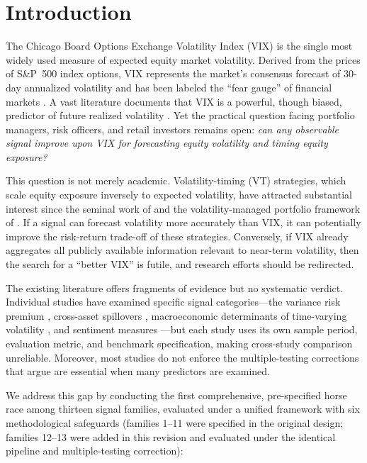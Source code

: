 \documentclass[12pt,a4paper]{article}
\begin{document}
\newpage
\tableofcontents
\newpage

\section{Introduction}
\label{sec:intro}

The Chicago Board Options Exchange Volatility Index (VIX) is the single most widely used measure of expected equity market volatility. Derived from the prices of S\&P~500 index options, VIX represents the market's consensus forecast of 30-day annualized volatility and has been labeled the ``fear gauge'' of financial markets \citep{whaley2000}. A vast literature documents that VIX is a powerful, though biased, predictor of future realized volatility \citep{christensen1998, jiang2005, bekaert2014}. Yet the practical question facing portfolio managers, risk officers, and retail investors remains open: \emph{can any observable signal improve upon VIX for forecasting equity volatility and timing equity exposure?}

This question is not merely academic. Volatility-timing (VT) strategies, which scale equity exposure inversely to expected volatility, have attracted substantial interest since the seminal work of \citet{fleming2001} and the volatility-managed portfolio framework of \citet{moreira2017}. If a signal can forecast volatility more accurately than VIX, it can potentially improve the risk-return trade-off of these strategies. Conversely, if VIX already aggregates all publicly available information relevant to near-term volatility, then the search for a ``better VIX'' is futile, and research efforts should be redirected.

The existing literature offers fragments of evidence but no systematic verdict. Individual studies have examined specific signal categories---the variance risk premium \citep{bollerslev2009}, cross-asset spillovers \citep{diebold2012}, macroeconomic determinants of time-varying volatility \citep{schwert1989, engle2008}, and sentiment measures \citep{baker2006}---but each study uses its own sample period, evaluation metric, and benchmark specification, making cross-study comparison unreliable. Moreover, most studies do not enforce the multiple-testing corrections that \citet{harvey2016} argue are essential when many predictors are examined.

We address this gap by conducting the first comprehensive, pre-specified horse race among thirteen signal families, evaluated under a unified framework with six methodological safeguards (families 1--11 were specified in the original design; families 12--13 were added in this revision and evaluated under the identical pipeline and multiple-testing correction):
\end{document}
